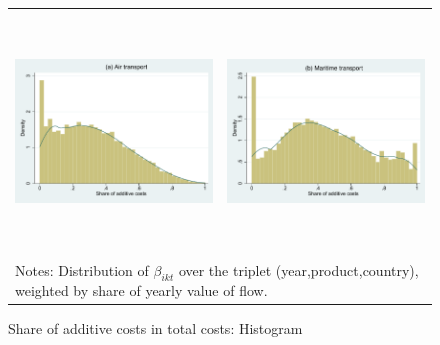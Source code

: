 \documentclass[a4paper,11pt]{article}
\begin{document}
\begin{figure}[htbp]
\caption{Share of additive costs in total costs: Histogram}
\label{fig:histogram_beta}
\begin{center}
\begin{tabular}{cc}
\includegraphics[width=3.0in, height=2.5in]{Etude_beta_pondere_air.pdf}
& \includegraphics[width=3.0in,height=2.5in]{Etude_beta_pondere_ves.pdf} \\
\multicolumn{2}{l}{{\footnotesize Notes: Distribution of $\beta_{ikt}$ over the triplet (year,product,country), weighted by share of yearly value of flow.}}\\
\end{tabular}
\end{center}
\end{figure}
\end{document}
